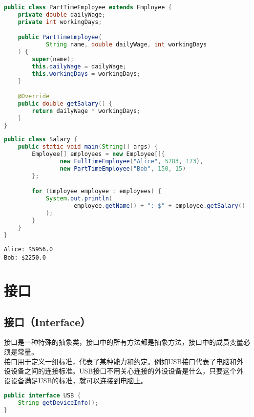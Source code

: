 \begin{lstlisting}[language=Java]
public class PartTimeEmployee extends Employee {
    private double dailyWage;
    private int workingDays;

    public PartTimeEmployee(
            String name, double dailyWage, int workingDays
    ) {
        super(name);
        this.dailyWage = dailyWage;
        this.workingDays = workingDays;
    }

    @Override
    public double getSalary() {
        return dailyWage * workingDays;
    }
}
\end{lstlisting}

\begin{lstlisting}[language=Java]
public class Salary {
    public static void main(String[] args) {
        Employee[] employees = new Employee[]{
                new FullTimeEmployee("Alice", 5783, 173),
                new PartTimeEmployee("Bob", 150, 15)
        };

        for (Employee employee : employees) {
            System.out.println(
                    employee.getName() + ": $" + employee.getSalary()
            );
        }
    }
}
\end{lstlisting}

\begin{tcolorbox}
    \begin{verbatim}
Alice: $5956.0
Bob: $2250.0
	\end{verbatim}
\end{tcolorbox}

\newpage

\section{接口}

\subsection{接口（Interface）}

接口是一种特殊的抽象类，接口中的所有方法都是抽象方法，接口中的成员变量必须是常量。\\

接口用于定义一组标准，代表了某种能力和约定。例如USB接口代表了电脑和外设设备之间的连接标准。USB接口不用关心连接的外设设备是什么，只要这个外设设备满足USB的标准，就可以连接到电脑上。\\


\begin{lstlisting}[language=Java]
public interface USB {
    String getDeviceInfo();
}
\end{lstlisting}

